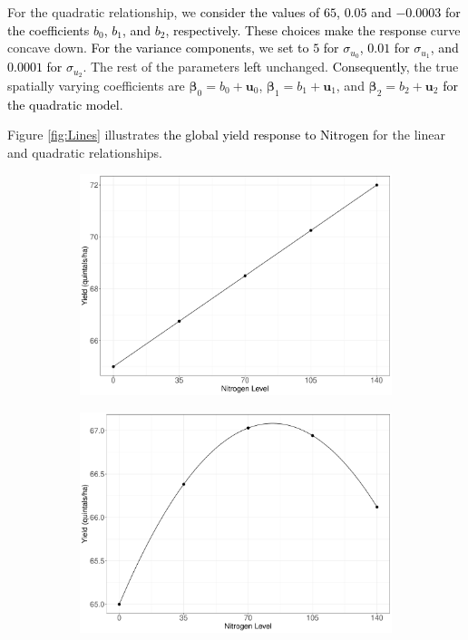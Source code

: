 \documentclass[a4paper]{article} 	%
\newcommand{\revision}[1]{\textcolor{black}{#1}}
\newcommand{\zc}[1]{\textcolor{black}{#1}}
\begin{document}
For the quadratic relationship, we \revision{consider the} \zc{values of $65$, $0.05$ and $-0.0003$ for the coefficients $b_0$, $b_1$, and $b_2$, respectively.} \revision{These choices make the response} curve concave down. \revision{For the variance components,} we \zc{set to $5$ for $\sigma_{u_0}$, $0.01$ for $\sigma_{u_1}$, and $0.0001$ for $\sigma_{u_2}$}. The rest of the parameters \revision{left} unchanged. \revision{Consequently}, the true spatially varying coefficients are $\bm{\beta}_0 = b_0 + \bm{u}_0$, $\bm{\beta}_1 = b_1 + \bm{u}_1$, and $\bm{\beta}_2 = b_2 + \bm{u}_2$ \zc{for the quadratic model}. 

Figure \ref{fig:Lines} illustrates \revision{the global yield response to Nitrogen} for the linear and quadratic relationships.
\begin{figure}[H]
	\begin{subfigure}[t]{0.45\textwidth}
		\centering
		\includegraphics[width=\linewidth]{LinlinesV2.pdf}
 \end{subfigure}
	\hspace{0.05\textwidth}
	\begin{subfigure}[t]{0.45\textwidth}
		\centering
		\includegraphics[width=\linewidth]{QualinesV2.pdf}

\end{subfigure}
\end{figure}
\end{document}
